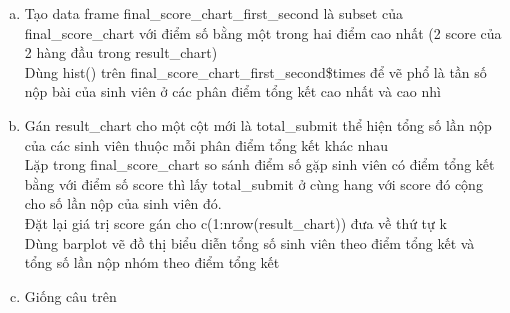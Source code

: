 \documentclass[a4paper]{article}
\theoremstyle{definition}
\begin{document}
\begin{enumerate}
\begin{enumerate}[a)]
    \item Tạo data frame final\_score\_chart\_first\_second là subset của final\_score\_chart với điểm số bằng một trong hai điểm cao nhất (2 score của 2 hàng đầu trong result\_chart)\\
    Dùng hist() trên final\_score\_chart\_first\_second\$times để vẽ phổ là tần số nộp bài của sinh viên ở các phân điểm  tổng kết cao nhất và cao nhì
    \item Gán result\_chart cho một cột mới là total\_submit thể hiện tổng số lần nộp của các sinh viên thuộc mỗi phân điểm tổng kết khác nhau\\
    Lặp trong final\_score\_chart so sánh điểm số gặp sinh viên có điểm tổng kết bằng với điểm số score thì lấy total\_submit ở cùng hang với score đó cộng cho số lần nộp của sinh viên đó.\\
    Đặt lại giá trị score gán cho c(1:nrow(result\_chart)) đưa về thứ tự k\\
    Dùng barplot vẽ đồ thị biểu diễn tổng số sinh viên theo điểm tổng kết và tổng số lần nộp nhóm theo điểm tổng kết
    \item Giống câu trên 
    \end{enumerate}
\end{enumerate}
\end{document}
